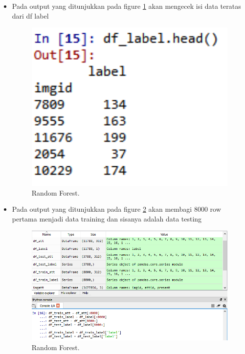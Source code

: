 \begin{enumerate}
\begin{itemize}
\item Pada output yang ditunjukkan pada figure \ref{YNS443} akan mengecek isi data teratas dari df label

	\begin{figure}[ht]
	\centerline{\includegraphics[width=1\textwidth]{figures/YN/Chapter3/No4/YNS443.png}}
	\caption{Random Forest.}
	\label{YNS443}
	\end{figure}

\item Pada output yang ditunjukkan pada figure \ref{YNS444} akan membagi 8000 row pertama menjadi data training dan sisanya adalah data testing

	\begin{figure}[ht]
	\centerline{\includegraphics[width=1\textwidth]{figures/YN/Chapter3/No4/YNS444.png}}
	\caption{Random Forest.}
	\label{YNS444}
	\end{figure}


\end{itemize}
\end{enumerate}
